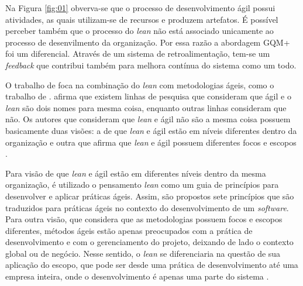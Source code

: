 Na Figura \ref{fig:01} obverva-se que o processo de desenvolvimento ágil possui atividades, as quais utilizam-se de recursos e produzem artefatos. É possível perceber também que o processo do \textit{lean} não está associado unicamente ao processo de desenvilmento da organização. Por essa razão a abordagem GQM+ foi um diferencial. Através de um sistema de retroalimentação, tem-se um \textit{feedback} que contribui também para melhora contínua do sistema como um todo.

O trabalho de  foca na combinação do \textit{lean} com metodologias ágeis, como o trabalho de .  afirma que existem linhas de pesquisa que consideram que ágil e o \textit{lean} são dois nomes para mesma coisa, enquanto outras linhas consideram que não. Os autores que consideram que \textit{lean} e ágil não são a mesma coisa possuem basicamente duas visões: a de que \textit{lean} e ágil estão em níveis diferentes dentro da organização e outra que afirma que \textit{lean} e ágil possuem diferentes focos e escopos \cite{6005500}. 




Para visão de que \textit{lean} e ágil estão em diferentes níveis dentro da mesma organização, é utilizado o pensamento \textit{lean} como um guia de princípios para desenvolver e aplicar práticas ágeis. Assim, são propostos sete princípios que são traduzidos para práticas ágeis no contexto do desenvolvimento de um \textit{software}. Para outra visão, que considera que as metodologias possuem focos e escopos diferentes, métodos ágeis estão apenas preocupados com a prática de desenvolvimento e com o gerenciamento do projeto, deixando de lado o contexto global ou de negócio. Nesse sentido, o \textit{lean} se diferenciaria na questão de sua aplicação do escopo, que pode ser desde uma prática de desenvolvimento até uma empresa inteira, onde o desenvolvimento é apenas uma parte do sistema \cite{6005500}. 

